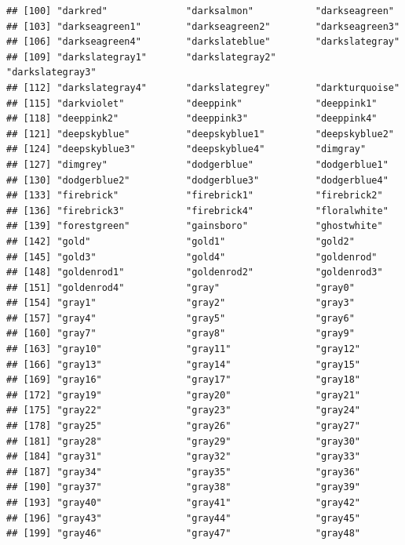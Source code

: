 \documentclass[]{book}
\begin{document}
\begin{verbatim}
## [100] "darkred"              "darksalmon"           "darkseagreen"        
## [103] "darkseagreen1"        "darkseagreen2"        "darkseagreen3"       
## [106] "darkseagreen4"        "darkslateblue"        "darkslategray"       
## [109] "darkslategray1"       "darkslategray2"       "darkslategray3"      
## [112] "darkslategray4"       "darkslategrey"        "darkturquoise"       
## [115] "darkviolet"           "deeppink"             "deeppink1"           
## [118] "deeppink2"            "deeppink3"            "deeppink4"           
## [121] "deepskyblue"          "deepskyblue1"         "deepskyblue2"        
## [124] "deepskyblue3"         "deepskyblue4"         "dimgray"             
## [127] "dimgrey"              "dodgerblue"           "dodgerblue1"         
## [130] "dodgerblue2"          "dodgerblue3"          "dodgerblue4"         
## [133] "firebrick"            "firebrick1"           "firebrick2"          
## [136] "firebrick3"           "firebrick4"           "floralwhite"         
## [139] "forestgreen"          "gainsboro"            "ghostwhite"          
## [142] "gold"                 "gold1"                "gold2"               
## [145] "gold3"                "gold4"                "goldenrod"           
## [148] "goldenrod1"           "goldenrod2"           "goldenrod3"          
## [151] "goldenrod4"           "gray"                 "gray0"               
## [154] "gray1"                "gray2"                "gray3"               
## [157] "gray4"                "gray5"                "gray6"               
## [160] "gray7"                "gray8"                "gray9"               
## [163] "gray10"               "gray11"               "gray12"              
## [166] "gray13"               "gray14"               "gray15"              
## [169] "gray16"               "gray17"               "gray18"              
## [172] "gray19"               "gray20"               "gray21"              
## [175] "gray22"               "gray23"               "gray24"              
## [178] "gray25"               "gray26"               "gray27"              
## [181] "gray28"               "gray29"               "gray30"              
## [184] "gray31"               "gray32"               "gray33"              
## [187] "gray34"               "gray35"               "gray36"              
## [190] "gray37"               "gray38"               "gray39"              
## [193] "gray40"               "gray41"               "gray42"              
## [196] "gray43"               "gray44"               "gray45"              
## [199] "gray46"               "gray47"               "gray48"              

\end{verbatim}
\end{document}
